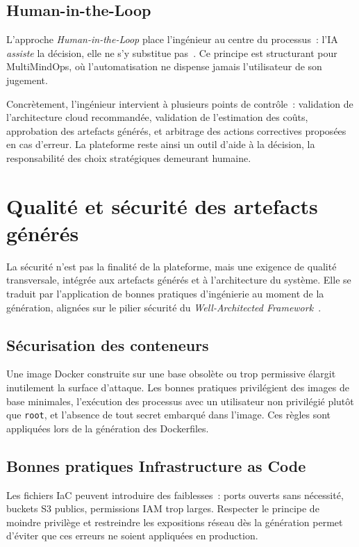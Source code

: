 \subsection{Human-in-the-Loop}

L'approche \textit{Human-in-the-Loop} place l'ingénieur au centre du processus~: l'IA
\emph{assiste} la décision, elle ne s'y substitue pas~\cite{HITL_MOSQUEIRA}. Ce principe est
structurant pour MultiMindOps, où l'automatisation ne dispense jamais l'utilisateur de son
jugement.

Concrètement, l'ingénieur intervient à plusieurs points de contrôle~: validation de
l'architecture cloud recommandée, validation de l'estimation des coûts, approbation des
artefacts générés, et arbitrage des actions correctives proposées en cas d'erreur. La
plateforme reste ainsi un outil d'aide à la décision, la responsabilité des choix
stratégiques demeurant humaine.

\section{Qualité et sécurité des artefacts générés}

La sécurité n'est pas la finalité de la plateforme, mais une exigence de qualité
transversale, intégrée aux artefacts générés et à l'architecture du système. Elle se traduit
par l'application de bonnes pratiques d'ingénierie au moment de la génération, alignées sur
le pilier sécurité du \textit{Well-Architected Framework}~\cite{AWS_WELL_ARCHITECTED}.

\subsection{Sécurisation des conteneurs}

Une image Docker construite sur une base obsolète ou trop permissive élargit inutilement la
surface d'attaque. Les bonnes pratiques privilégient des images de base minimales, l'exécution
des processus avec un utilisateur non privilégié plutôt que \texttt{root}, et l'absence de
tout secret embarqué dans l'image. Ces règles sont appliquées lors de la génération des
Dockerfiles.

\subsection{Bonnes pratiques Infrastructure as Code}

Les fichiers IaC peuvent introduire des faiblesses~: ports ouverts sans nécessité, buckets
S3 publics, permissions IAM trop larges. Respecter le principe de moindre privilège et
restreindre les expositions réseau dès la génération permet d'éviter que ces erreurs ne
soient appliquées en production.


